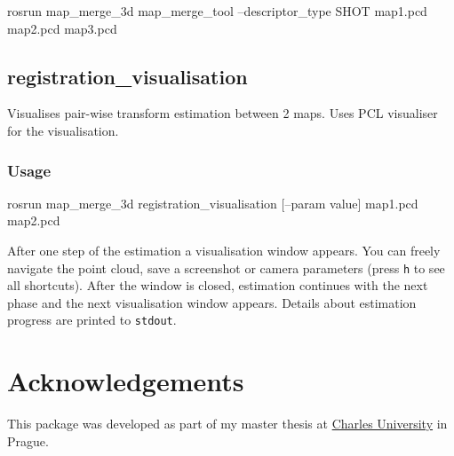 \begin{code}
rosrun map_merge_3d map_merge_tool --descriptor_type SHOT map1.pcd
map2.pcd map3.pcd
\end{code}

\subsection{registration\_visualisation}

Visualises pair-wise transform estimation between 2 maps. Uses \gls{PCL} visualiser for the visualisation.

\subsubsection{Usage}

\begin{code}
rosrun map_merge_3d registration_visualisation [--param value]
map1.pcd map2.pcd
\end{code}

After one step of the estimation a visualisation window appears. You can freely navigate the point cloud, save a screenshot or camera parameters (press \texttt{h} to see all shortcuts). After the window is closed, estimation continues with the next phase and the next visualisation window appears. Details about estimation progress are printed to \texttt{stdout}.

\section{Acknowledgements}

This package was developed as part of my master thesis at \href{http://www.mff.cuni.cz/to.en/}{Charles University} in Prague.
